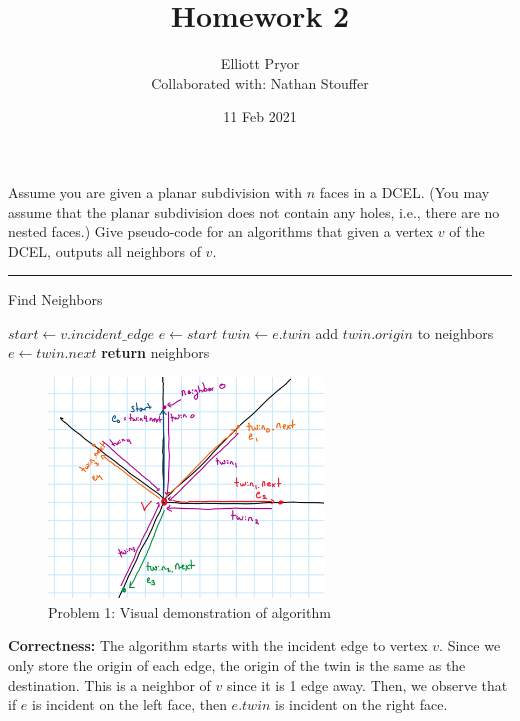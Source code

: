 \documentclass[11pt]{article}
\title{Homework 2}
\author{Elliott Pryor \\
Collaborated with: Nathan Stouffer}
\date{11 Feb 2021}
\begin{document}
\maketitle


Assume you are given a planar subdivision with $n$ faces in a DCEL. (You may
assume that the planar subdivision does not contain any holes, i.e., there are
no nested faces.) Give pseudo-code for an algorithms that given a vertex $v$ of
the DCEL, outputs all neighbors of $v$.

\hrule

\begin{algorithm}
    \caption{Find Neighbors}
    \label{alg:neighbors}
    \begin{algorithmic}[1]
        \State $start \gets v.incident\_edge$
        \State $e \gets start$
        \Do
            \State $twin \gets e.twin$
            \State add $twin.origin$ to neighbors
            \State $e \gets twin.next$
        \State \textbf{return} neighbors
    \EndFunction
    \end{algorithmic}
\end{algorithm}


\begin{figure}[h]
    \centering
    \includegraphics[width = 0.65\textwidth]{prob1}
    \caption{Problem 1: Visual demonstration of algorithm}
\end{figure}

\textbf{Correctness:} The algorithm starts with the incident edge to vertex $v$. 
Since we only store the origin of each edge, the origin of the twin is the same as the destination.
This is a neighbor of $v$ since it is 1 edge away. 
Then, we observe that if $e$ is incident on the left face, then $e.twin$ is incident on the right face.
\end{document}
